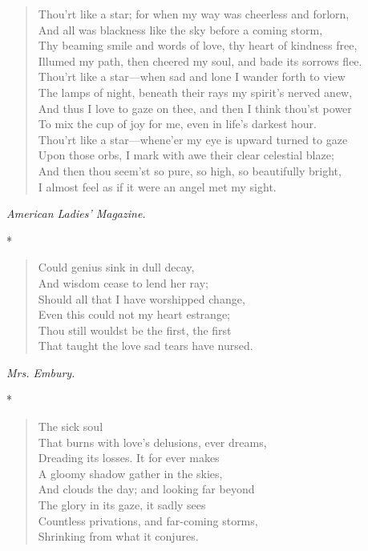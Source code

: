 \documentclass[11pt,twoside]{article}
\newcommand\stars{\begin{center}*\quad*\quad*\end{center}}
\newcommand\by[1]{\par\hfill\textit{#1}\par}
\begin{document}
\begin{verse}
Thou’rt like a star; for when my way was cheerless and forlorn,\\
And all was blackness like the sky before a coming storm,\\
Thy beaming smile and words of love, thy heart of kindness free,\\
Illumed my path, then cheered my soul, and bade its sorrows flee.\\
Thou’rt like a star---when sad and lone I wander forth to view\\
The lamps of night, beneath their rays my spirit’s nerved anew,\\
And thus I love to gaze on thee, and then I think thou’st power\\
To mix the cup of joy for me, even in life’s darkest hour.\\
Thou’rt like a star---whene’er my eye is upward turned to gaze\\
Upon those orbs, I mark with awe their clear celestial blaze;\\
And then thou seem’st so pure, so high, so beautifully bright,\\
I almost feel as if it were an angel met my sight.
\end{verse}

\by{American Ladies’ Magazine.}

\stars

\begin{verse}
Could genius sink in dull decay,\\
And wisdom cease to lend her ray;\\
Should all that I have worshipped change,\\
Even this could not my heart estrange;\\
Thou still wouldst be the first, the first\\
That taught the love sad tears have nursed.
\end{verse}

\by{Mrs. Embury.}

\stars

\begin{verse}
\quad The sick soul\\
That burns with love’s delusions, ever dreams,\\
Dreading its losses. It for ever makes\\
A gloomy shadow gather in the skies,\\
And clouds the day; and looking far beyond\\
The glory in its gaze, it sadly sees\\
Countless privations, and far-coming storms,\\
Shrinking from what it conjures.
\end{verse}
\end{document}
